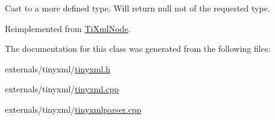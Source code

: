 Cast to a more defined type. Will return null not of the requested type. 



Reimplemented from \hyperlink{class_ti_xml_node_a6a4c8ac28ee7a745d059db6691e03bae}{Ti\-Xml\-Node}.



The documentation for this class was generated from the following files\-:\begin{DoxyCompactItemize}
\item 
externals/tinyxml/\hyperlink{tinyxml_8h}{tinyxml.\-h}\item 
externals/tinyxml/\hyperlink{tinyxml_8cpp}{tinyxml.\-cpp}\item 
externals/tinyxml/\hyperlink{tinyxmlparser_8cpp}{tinyxmlparser.\-cpp}\end{DoxyCompactItemize}
